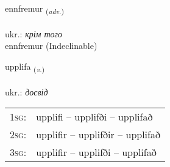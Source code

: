 \documentclass[frontgrid, backgrid]{flacards}\usepackage[]{graphicx}\usepackage[]{xcolor}
\begin{document}

\renewcommand{\flhead}{\vskip5pt \fboxsep=0pt {\small\bfseries\footnotesize Atviksorð | прислівник}}
\renewcommand{\fcfoot}{\vskip5pt \fboxsep=0pt \hspace{2pt}{\small\bfseries\footnotesize 2K}}

\renewcommand{\blhead}{\vskip5pt {\small\bfseries\footnotesize Atviksorð | прислівник }}
\renewcommand{\bcfoot}{\vskip5pt \hspace{2pt}{\small\bfseries\footnotesize 2K}}


{ennfremur \small{\textsubscript{(\textit{adv.})}} \\[1ex]
\textphonetic{[ɛnfrɛmʏr]} \\
ukr.: \emph{крім того} \\  [2ex]
ennfremur (Indeclinable)}

\renewcommand{\flhead}{\vskip5pt \fboxsep=0pt {\small\bfseries\footnotesize Sagnorð | дієслово}}
\renewcommand{\fcfoot}{\vskip5pt \fboxsep=0pt \hspace{2pt}{\small\bfseries\footnotesize 2K}}

\renewcommand{\blhead}{\vskip5pt {\small\bfseries\footnotesize Sagnorð | дієслово }}
\renewcommand{\bcfoot}{\vskip5pt \hspace{2pt}{\small\bfseries\footnotesize 2K}}


{upplifa \small{\textsubscript{(\textit{v.})}} \\[1ex] %
\textphonetic{[ʏhplɪva]} \\
ukr.: \emph{досвід} \\  [2ex]
\renewcommand*{\arraystretch}{0.8}
\begin{tabular}{p{1cm}l}
\textsc{1sg}: & upplifi -- upplifði -- upplifað \\ 
\textsc{2sg}: & upplifir -- upplifðir -- upplifað \\ 
\textsc{3sg}: & upplifir -- upplifði -- upplifað \\ 
\end{tabular}
}
\end{document}
